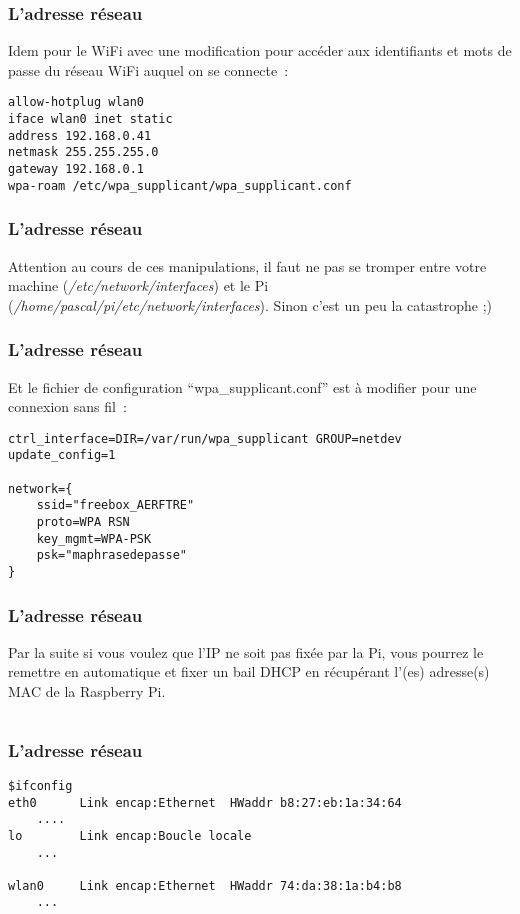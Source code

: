 \begin{frame}[containsverbatim]
\frametitle{L'adresse réseau}

Idem pour le WiFi avec une modification pour accéder aux identifiants et mots de passe du réseau WiFi auquel on se connecte~:
\begin{verbatim}
allow-hotplug wlan0
iface wlan0 inet static
address 192.168.0.41
netmask 255.255.255.0
gateway 192.168.0.1
wpa-roam /etc/wpa_supplicant/wpa_supplicant.conf
\end{verbatim}
\end{frame}

\begin{frame}[containsverbatim]
\frametitle{L'adresse réseau}

Attention au cours de ces manipulations, il faut ne pas se tromper entre votre machine (\emph{/etc/network/interfaces}) et le Pi (\emph{/home/pascal/pi/etc/network/interfaces}). Sinon c'est un peu la catastrophe ;)
\end{frame}

\begin{frame}[containsverbatim]
\frametitle{L'adresse réseau}

Et le fichier de configuration ``wpa\_supplicant.conf'' est à modifier pour une connexion sans fil~:

\begin{verbatim}
ctrl_interface=DIR=/var/run/wpa_supplicant GROUP=netdev
update_config=1

network={
    ssid="freebox_AERFTRE"
    proto=WPA RSN
    key_mgmt=WPA-PSK
    psk="maphrasedepasse"
}
\end{verbatim}
\end{frame}

\begin{frame}[containsverbatim]
\frametitle{L'adresse réseau}

Par la suite si vous voulez que l'IP ne soit pas fixée par la Pi, vous pourrez le remettre en automatique et fixer un bail DHCP en récupérant l'(es) adresse(s) MAC de la Raspberry Pi.

\begin{verbatim}

\end{verbatim}

\end{frame}

\begin{frame}[containsverbatim]
\frametitle{L'adresse réseau}

\begin{verbatim}
$ifconfig
eth0      Link encap:Ethernet  HWaddr b8:27:eb:1a:34:64  
	....
lo        Link encap:Boucle locale  
	...
	
wlan0     Link encap:Ethernet  HWaddr 74:da:38:1a:b4:b8  
	...
\end{verbatim}

\end{frame}

